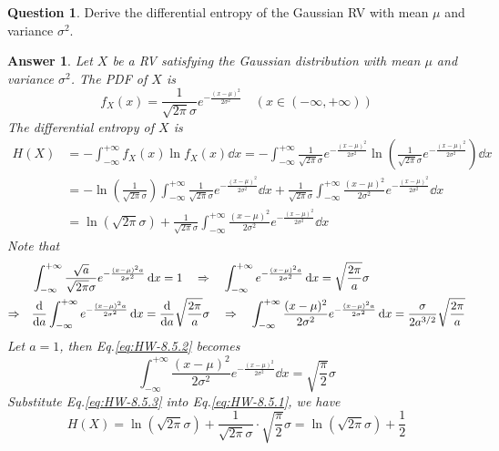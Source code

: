 \documentclass[utf8]{article}
\theoremstyle{definition}%
\newtheorem{question}{Question} %
\theoremstyle{plain}%
\newtheorem{answer}{Answer} %
\begin{document}
\begin{question}
    Derive the differential entropy of the Gaussian RV with mean $\mu$ and variance $\sigma^2$.
\end{question}
\begin{answer}
    Let $X$ be a RV satisfying the Gaussian distribution with mean $\mu$ and variance $\sigma^2$. The PDF of $X$ is
    \begin{equation}
        f_{X}(x) = \frac{1}{\sqrt{2\pi}\sigma} e^{-\frac{(x - \mu)^2}{2\sigma^2}} \quad (x \in (-\infty, +\infty))
    \end{equation}
    The differential entropy of $X$ is
    \begin{equation}
    \begin{aligned}
        \label{eq:HW-8.5.1}
        H(X) &= -\int_{-\infty}^{+\infty} f_{X}(x) \ln f_{X}(x) \dd{x} = -\int_{-\infty}^{+\infty} \frac{1}{\sqrt{2\pi}\sigma} e^{-\frac{(x - \mu)^2}{2\sigma^2}} \ln \left(\frac{1}{\sqrt{2\pi}\sigma} e^{-\frac{(x - \mu)^2}{2\sigma^2}}\right) \dd{x} \\ 
        &= - \ln\left(\frac{1}{\sqrt{2\pi}\sigma}\right) \int_{-\infty}^{+\infty} \frac{1}{\sqrt{2\pi}\sigma} e^{-\frac{(x - \mu)^2}{2\sigma^2}} \dd{x} + \frac{1}{\sqrt{2\pi}\sigma} \int_{-\infty}^{+\infty} \frac{(x - \mu)^2}{2\sigma^2} e^{-\frac{(x - \mu)^2}{2\sigma^2}} \dd{x} \\
        &= \ln\left(\sqrt{2\pi}\sigma\right) + \frac{1}{\sqrt{2\pi}\sigma} \int_{-\infty}^{+\infty} \frac{(x - \mu)^2}{2\sigma^2} e^{-\frac{(x - \mu)^2}{2\sigma^2}} \dd{x}
    \end{aligned}
    \end{equation}
    Note that 
    \begin{equation}
    \begin{aligned}
        \label{eq:HW-8.5.2}
        &\int_{-\infty}^{+\infty} \frac{\sqrt{a}}{\sqrt{2\pi}\sigma} e^{-\frac{(x - \mu)^2 a}{2\sigma^2}} \dd{x} = 1 \quad\Rightarrow\quad \int_{-\infty}^{+\infty} e^{-\frac{(x - \mu)^2 a}{2\sigma^2}} \dd{x} = \sqrt{\frac{2\pi}{a}}\sigma \\ 
        \Rightarrow\quad &\dv{a} \int_{-\infty}^{+\infty} e^{-\frac{(x - \mu)^2 a}{2\sigma^2}} \dd{x} = \dv{a} \sqrt{\frac{2\pi}{a}}\sigma \quad\Rightarrow\quad \int_{-\infty}^{+\infty} \frac{(x - \mu)^2}{2\sigma^2} e^{-\frac{(x - \mu)^2 a}{2\sigma^2}} \dd{x} = \frac{\sigma}{2a^{3/2}}\sqrt{\frac{2\pi}{a}} 
    \end{aligned}
    \end{equation}
    Let $a = 1$, then Eq.\ref{eq:HW-8.5.2} becomes
    \begin{equation}
        \label{eq:HW-8.5.3}
        \int_{-\infty}^{+\infty} \frac{(x - \mu)^2}{2\sigma^2} e^{-\frac{(x - \mu)^2}{2\sigma^2}} \dd{x} = \sqrt{\frac{\pi}{2}}\sigma
    \end{equation}
    Substitute Eq.\ref{eq:HW-8.5.3} into Eq.\ref{eq:HW-8.5.1}, we have
    \begin{equation}
        H(X) = \ln\left(\sqrt{2\pi}\sigma\right) + \frac{1}{\sqrt{2\pi}\sigma} \cdot \sqrt{\frac{\pi}{2}}\sigma = \ln\left(\sqrt{2\pi}\sigma\right) + \frac{1}{2}
    \end{equation}
\end{answer}
\end{document}
